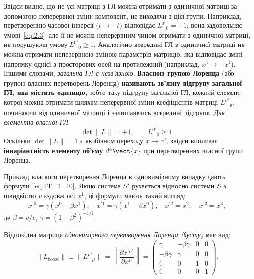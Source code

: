Звідси видно, що не усі матриці з ГЛ можна отримати з одиничної матриці за допомогою неперервної зміни компонент, не
виходячи з цієї групи. Наприклад, перетворенню часової інверсії ($t \to -t$) відповідає $L^{0'}{}_0 = -1$; вона
задовольняє умові~\eqref{eq:2.3}, але її не можна неперервним чином отримати з одиничної матриці, не порушуючи умову
$L^{0'}{}_0 \geqslant1$. Аналогічно всередині ГЛ з одиничної матриці не можна отримати неперервною зміною параметрів
матрицю, яка відповідає зміні напрямку однієї з просторових осей на протилежний (наприклад, $x^1 \to -x^1$). Іншими
словами, \textit{загальна ГЛ є незв'язною.} \textbf{Власною групою Лоренца} (або групою власних перетворень Лоренца)
\textbf{називають зв'язну підгрупу загальної ГЛ, яка містить одиницю,}
тобто таку підгрупу загальної ГЛ, кожний елемент котрої можна отримати шляхом неперервної зміни коефіцієнтів матриці
$L^{\mu'}{}_\mu$, починаючи від одиничної матриці і залишаючись всередині підгрупи.
\textit{Для елементів власної ГЛ}
\begin{equation*}
  \det\| L \| = +1, \qquad L^{0'}{}_0 \geqslant 1.
\end{equation*}
Оскільки $\det \|L\| = 1$ є якобіаном переходу $x \to x'$, звідси випливає \textbf{інваріантність елементу об'єму}
$d^4\vect{x}$ при перетвореннях власної групи Лоренца.

Приклад власного перетворення Лоренца в одновимірному випадку дають формули~\eqref{eq:LT_1_10}. Якщо система $S'$
рухається відносно системи $S$ з швидкістю $v$ вздовж осі $x^1$, ці формули мають такий вигляд:
\begin{equation*}
  x^{\prime 0} = \gamma(x^0 - \beta x^1),\quad
  x^{\prime 1} = \gamma(x^1 - \beta x^0),\quad
  x^{\prime 2} = x^2;\quad
  x^{\prime 3} = x^3,
\end{equation*}
де $\beta = v/c$, $\gamma = (1-\beta^2)^{-1/2}$.

Відповідна матриця \textit{одновимірного перетворення Лоренца (бусту)} має вид:
\begin{equation}\label{eq:BoostMatrix}
  \|L_\text{boost}\| \equiv \|L^{\mu'}{}_\mu\| = \left\|\frac{\partial x^{\prime\mu'}}{\partial x^\mu}\right\| =
  \begin{pmatrix}
    \gamma       & -\beta\gamma & 0 & 0 \\
    -\beta\gamma & \gamma       & 0 & 0 \\
    0            & 0            & 1 & 0 \\
    0            & 0            & 0 & 1
  \end{pmatrix}.
\end{equation}

